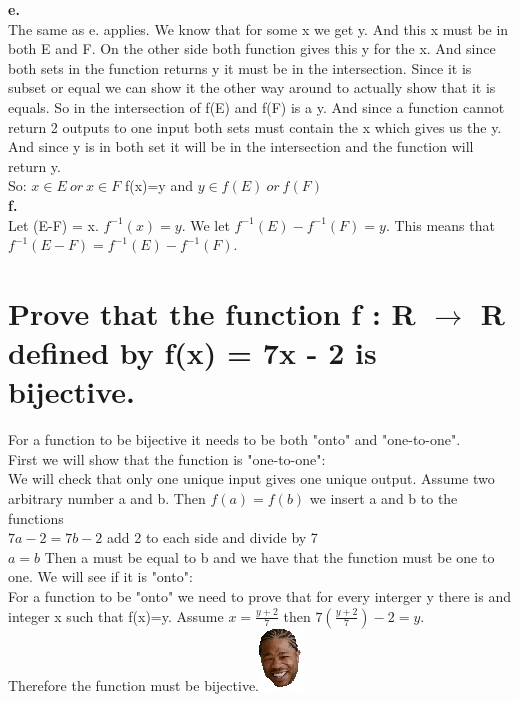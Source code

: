 \textbf{e.}\\
The same as e. applies. We know that for some x we get y. And this x must be in both E and F. On the other side both function gives this y for the x. And since both sets in the function returns y it must be in the intersection. Since it is subset or equal we can show it the other way around to actually show that it is equals. So in the intersection of f(E) and f(F) is a y. And since a function cannot return 2 outputs to one input both sets must contain the x which gives us the y. And since y is in both set it will be in the intersection and the function will return y.\\
So: $x\in E \ or\ x \in F$ f(x)=y and $y\in f(E)\ or\ f(F)$\\
\textbf{f.}\\
Let (E-F) = x. $f^{-1}(x) = y$. We let $f^{-1}(E) - f^{-1}(F) = y$. This means that $f^{-1}(E-F) = f^{-1}(E) - f^{-1}(F)$.\\
\newpage
\section{Prove that the function f : R $\rightarrow$ R defined by f(x) = 7x - 2 is bijective.}
For a function to be bijective it needs to be both "onto" and "one-to-one".\\
First we will show that the function is "one-to-one":\\
We will check that only one unique input gives one unique output. Assume two arbitrary number a and b. Then $f(a)=f(b)$ we insert a and b to the functions\\
$7a-2=7b-2$ add 2 to each side and divide by 7\\
$a=b$ Then a must be equal to b and we have that the function must be one to one.
We will see if it is "onto":\\
For a function to be "onto" we need to prove that for every interger y there is and integer x such that f(x)=y. Assume $x=\frac{y+2}{7}$ then $7(\frac{y+2}{7})-2=y$.\\
Therefore the function must be bijective.\includegraphics[scale=0.70]{billeder/xzibit}
\newpage
